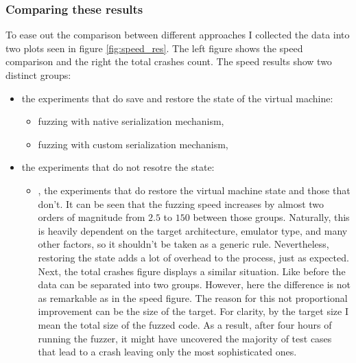 \subsubsection{Comparing these results}
To ease out the comparison between different approaches I collected the data into two plots seen in figure \ref{fig:speed_res}. The left figure shows the speed comparison and the right the total crashes count. The speed results show two distinct groups:
\begin{itemize}
    \item the experiments that do save and restore the state of the virtual machine:
    \begin{itemize}
        \item fuzzing with native serialization mechanism,
        \item fuzzing with custom serialization mechanism,
    \end{itemize}
    \item the experiments that do not resotre the state:
    \begin{itemize}
        \item 

, the experiments that do restore the virtual machine state and those that don't. It can be seen that the fuzzing speed increases by almost two orders of magnitude from $2.5$ to $150$ between those groups. Naturally, this is heavily dependent on the target architecture, emulator type, and many other factors, so it shouldn't be taken as a generic rule. Nevertheless, restoring the state adds a lot of overhead to the process, just as expected. Next, the total crashes figure displays a similar situation. Like before the data can be separated into two groups. However, here the difference is not as remarkable as in the speed figure. The reason for this not proportional improvement can be the size of the target. For clarity, by the target size I mean the total size of the fuzzed code. As a result, after four hours of running the fuzzer, it might have uncovered the majority of test cases that lead to a crash leaving only the most sophisticated ones.


\end{itemize}
\end{itemize}
